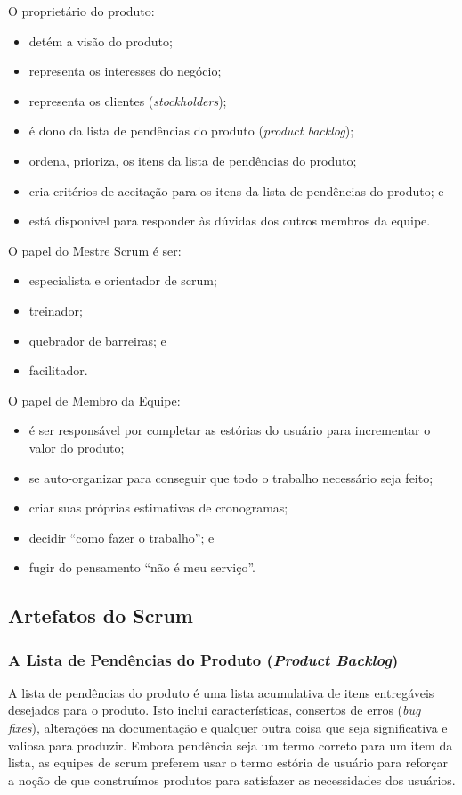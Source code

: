 \documentclass[
	11pt,				%
	openright,
	twoside,			%
	a4paper,			%
	english,			%
	french,
	brazil,				%
	sumario=tradicional
	]{abntex2}
\begin{document}
O proprietário do produto:
\begin{itemize}
\item detém a visão do produto;
\item representa os interesses do negócio;
\item representa os clientes (\textit{stockholders});
\item é dono da lista de pendências do produto (\textit{product backlog});
\item ordena, prioriza, os itens da lista de pendências do produto;
\item cria critérios de aceitação para os itens da lista de pendências do produto; e
\item está disponível para responder às dúvidas dos outros membros da equipe.
\end{itemize}

O papel do Mestre Scrum é ser:
\begin{itemize}
\item especialista e orientador de scrum;
\item treinador;
\item quebrador de barreiras; e
\item facilitador.
\end{itemize}

O papel de Membro da Equipe:
\begin{itemize}
\item é ser responsável por completar as estórias do usuário para incrementar o valor do produto;
\item se auto-organizar para conseguir que todo o trabalho necessário seja feito;
\item criar suas próprias estimativas de cronogramas;
\item decidir ``como fazer o trabalho''; e
\item fugir do pensamento ``não é meu serviço''.
\end{itemize}

\subsection{Artefatos do Scrum}
\subsubsection{A Lista de Pendências do Produto (\emph{Product Backlog})}
A lista de pendências do produto é uma lista acumulativa de itens entregáveis desejados para o produto. Isto inclui características, consertos de erros (\emph{bug fixes}), alterações na documentação e qualquer outra coisa que seja significativa e valiosa para produzir. Embora pendência seja um termo correto para um item da lista, as equipes de scrum preferem usar o termo estória de usuário para reforçar a noção de que construímos produtos para satisfazer as necessidades dos usuários.
\end{document}
